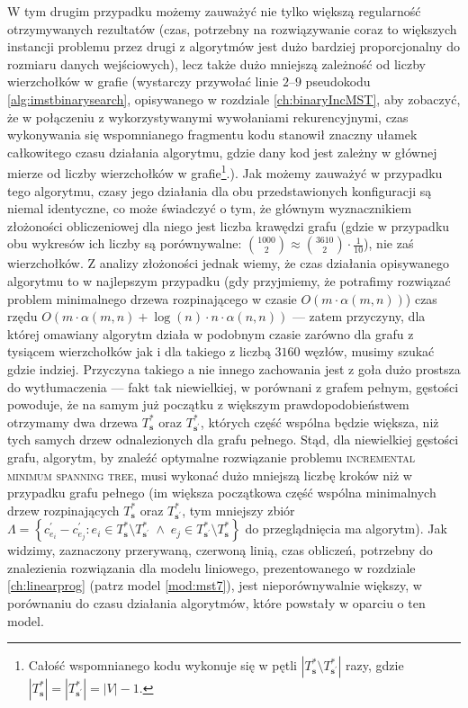 W tym drugim przypadku możemy zauważyć nie tylko większą regularność otrzymywanych rezultatów (czas, potrzebny na rozwiązywanie coraz to większych instancji problemu przez drugi z algorytmów jest dużo bardziej proporcjonalny do rozmiaru danych wejściowych), lecz także dużo mniejszą zależność od liczby wierzchołków w grafie (wystarczy przywołać linie $2$--$9$ pseudokodu \ref{alg:imstbinarysearch}, opisywanego w rozdziale \ref{ch:binaryIncMST}, aby zobaczyć, że w połączeniu z wykorzystywanymi wywołaniami rekurencyjnymi, czas wykonywania się wspomnianego fragmentu kodu stanowił znaczny ułamek całkowitego czasu działania algorytmu, gdzie dany kod jest zależny w głównej mierze od liczby wierzchołków w grafie\footnote{Całość wspomnianego kodu wykonuje się w pętli $\left| T^{\ast}_{\textbf{s}} \setminus T^{\ast}_{\textbf{s}^{\prime}} \right|$ razy, gdzie $\left| T^{\ast}_{\textbf{s}} \right| = \left| T^{\ast}_{\textbf{s}^{\prime}} \right| = \left| V \right| - 1$.}.). Jak możemy zauważyć w przypadku tego algorytmu, czasy jego działania dla obu przedstawionych konfiguracji są niemal identyczne, co może świadczyć o tym, że głównym wyznacznikiem złożoności obliczeniowej dla niego jest liczba krawędzi grafu (gdzie w przypadku obu wykresów ich liczby są porównywalne: $\binom{1000}{2} \approx \binom{3610}{2} \cdot \frac{1}{10}$), nie zaś wierzchołków. Z analizy złożoności jednak wiemy, że czas działania opisywanego algorytmu to w najlepszym przypadku (gdy przyjmiemy, że potrafimy rozwiązać problem minimalnego drzewa rozpinającego w czasie $O \left( m \cdot \alpha \left( m, n \right) \right)$) czas rzędu $O \left( m \cdot \alpha  \left( m, n \right) + \log \left( n \right) \cdot n \cdot \alpha \left( n, n \right) \right)$ --- zatem przyczyny, dla której omawiany algorytm działa w podobnym czasie zarówno dla grafu z tysiącem wierzchołków jak i dla takiego z liczbą $3160$ węzłów, musimy szukać gdzie indziej. Przyczyna takiego a nie innego zachowania jest z goła dużo prostsza do wytłumaczenia --- fakt tak niewielkiej, w porównani z grafem pełnym, gęstości powoduje, że na samym już początku z większym prawdopodobieństwem otrzymamy dwa drzewa $T^{\ast}_{\textbf{s}}$ oraz $T^{\ast}_{\textbf{s}^{\prime}}$, których część wspólna będzie większa, niż tych samych drzew odnalezionych dla grafu pełnego. Stąd, dla niewielkiej gęstości grafu, algorytm, by znaleźć optymalne rozwiązanie problemu \textsc{incremental minimum spanning tree}, musi wykonać dużo mniejszą liczbę kroków niż w przypadku grafu pełnego (im większa początkowa część wspólna minimalnych drzew rozpinających $T^{\ast}_{\textbf{s}}$ oraz $T^{\ast}_{\textbf{s}^{\prime}}$, tym mniejszy zbiór $\Lambda = \left\{ c^{\prime}_{e_{i}} - c^{\prime}_{e_{j}} : e_{i} \in T^{\ast}_{\textbf{s}} \setminus T^{\ast}_{\textbf{s}^{\prime}} \; \wedge \; e_{j} \in T^{\ast}_{\textbf{s}^{\prime}} \setminus T^{\ast}_{\textbf{s}} \right\}$ do przeglądnięcia ma algorytm). Jak widzimy, zaznaczony przerywaną, czerwoną linią, czas obliczeń, potrzebny do znalezienia rozwiązania dla modelu liniowego, prezentowanego w rozdziale \ref{ch:linearprog} (patrz model \ref{mod:mst7}),  jest nieporównywalnie większy, w porównaniu do czasu działania algorytmów, które powstały w oparciu o ten model.

